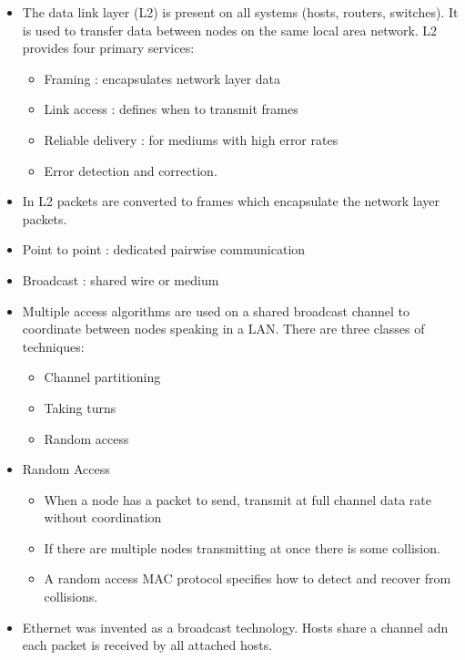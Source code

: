 \begin{itemize}
\tightlist
\item
  The data link layer (L2) is present on all systems (hosts, routers,
  switches). It is used to transfer data between nodes on the same local
  area network. L2 provides four primary services:

  \begin{itemize}
  \tightlist
  \item
    Framing : encapsulates network layer data
  \item
    Link access : defines when to transmit frames
  \item
    Reliable delivery : for mediums with high error rates
  \item
    Error detection and correction.
  \end{itemize}
\item
  In L2 packets are converted to frames which encapsulate the network
  layer packets.
\item
  Point to point : dedicated pairwise communication
\item
  Broadcast : shared wire or medium
\item
  Multiple access algorithms are used on a shared broadcast channel to
  coordinate between nodes speaking in a LAN. There are three classes of
  techniques:

  \begin{itemize}
  \tightlist
  \item
    Channel partitioning
  \item
    Taking turns
  \item
    Random access
  \end{itemize}
\item
  Random Access

  \begin{itemize}
  \tightlist
  \item
    When a node has a packet to send, transmit at full channel data rate
    without coordination
  \item
    If there are multiple nodes transmitting at once there is some
    collision.
  \item
    A random access MAC protocol specifies how to detect and recover
    from collisions.
  \end{itemize}
\item
  Ethernet was invented as a broadcast technology. Hosts share a channel
  adn each packet is received by all attached hosts.


\end{itemize}
